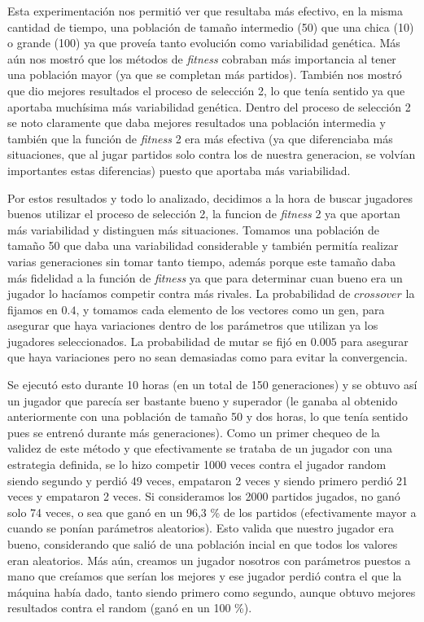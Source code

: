 \documentclass[A4paper,oneside,fleqn,11pt]{article}
\theoremstyle{definition}
\begin{document}
Esta experimentación nos permitió ver que resultaba más efectivo, en la misma cantidad de tiempo, una población de tamaño intermedio (50) que una chica (10) o grande (100) ya que proveía tanto evolución como variabilidad genética. Más aún nos mostró que los métodos de \textit{fitness} cobraban más importancia al tener una población mayor (ya que se completan más partidos). También nos mostró que dio mejores resultados el proceso de selección 2, lo que tenía sentido ya que aportaba muchísima más variabilidad genética. Dentro del proceso de selección 2 se noto claramente que daba mejores resultados una población intermedia y también que la función de \textit{fitness} 2 era más efectiva (ya que diferenciaba más situaciones, que al jugar partidos solo contra los de nuestra generacion, se volvían importantes estas diferencias) puesto que aportaba más variabilidad.

Por estos resultados y todo lo analizado, decidimos a la hora de buscar jugadores buenos utilizar el proceso de selección 2, la funcion de \textit{fitness} 2 ya que aportan más variabilidad y distinguen más situaciones. Tomamos una población de tamaño 50 que daba una variabilidad considerable y también permitía realizar varias generaciones sin tomar tanto tiempo, además porque este tamaño daba más fidelidad a la función de \textit{fitness} ya que para determinar cuan bueno era un jugador lo hacíamos competir contra más rivales. La probabilidad de $crossover$ la fijamos en $0.4$, y tomamos cada elemento de los vectores como un gen, para asegurar que haya variaciones dentro de los parámetros que utilizan ya los jugadores seleccionados. La probabilidad de mutar se fijó en $0.005$ para asegurar que haya variaciones pero no sean demasiadas como para evitar la convergencia.

Se ejecutó esto durante 10 horas (en un total de 150 generaciones) y se obtuvo así un jugador que parecía ser bastante bueno y superador (le ganaba al obtenido anteriormente con una población de tamaño 50 y dos horas, lo que tenía sentido pues se entrenó durante más generaciones). Como un primer chequeo de la validez de este método y que efectivamente se trataba de un jugador con una estrategia definida, se lo hizo competir 1000 veces contra el jugador random siendo segundo y perdió 49 veces, empataron 2 veces y siendo primero perdió 21 veces y empataron 2 veces. Si consideramos los 2000 partidos jugados, no ganó solo 74 veces, o sea que ganó en un 96,3 \% de los partidos (efectivamente mayor a cuando se ponían parámetros aleatorios). Esto valida que nuestro jugador era bueno, considerando que salió de una población incial en que todos los valores eran aleatorios. Más aún, creamos un jugador nosotros con parámetros puestos a mano que creíamos que serían los mejores y ese jugador perdió contra el que la máquina había dado, tanto siendo primero como segundo, aunque obtuvo mejores resultados contra el random (ganó en un 100 \%).
\end{document}
